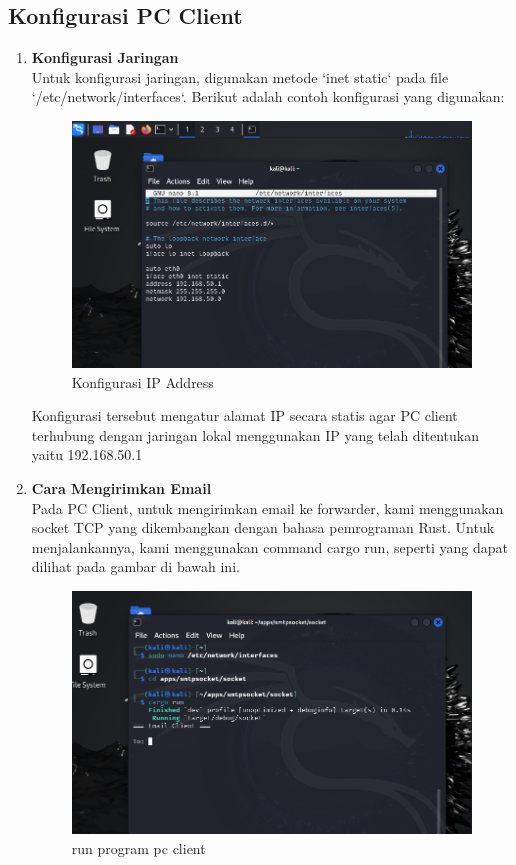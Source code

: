 \documentclass[12pt, a4paper]{article}
\begin{document}
\subsection{Konfigurasi PC Client}
\begin{enumerate}
  \item \textbf{Konfigurasi Jaringan} \\
  Untuk konfigurasi jaringan, digunakan metode `inet static` pada file `/etc/network/interfaces`. Berikut adalah contoh konfigurasi yang digunakan:
  \begin{figure}[h]
    \centering
    \includegraphics[width=12cm]{client.png}
    \caption{Konfigurasi IP Address}
  \end{figure}
  Konfigurasi tersebut mengatur alamat IP secara statis agar PC client terhubung dengan jaringan lokal menggunakan IP yang telah ditentukan yaitu 192.168.50.1
  \item \textbf{Cara Mengirimkan Email} \\
  Pada PC Client, untuk mengirimkan email ke forwarder, kami menggunakan socket TCP yang dikembangkan dengan bahasa pemrograman Rust. Untuk menjalankannya, kami menggunakan command cargo run, seperti yang dapat dilihat pada gambar di bawah ini.
    \begin{figure}[h]
    \centering
    \includegraphics[width=12cm]{runclient.png}
    \caption{run program pc client }
  \end{figure}
  


\end{enumerate}
\end{document}

